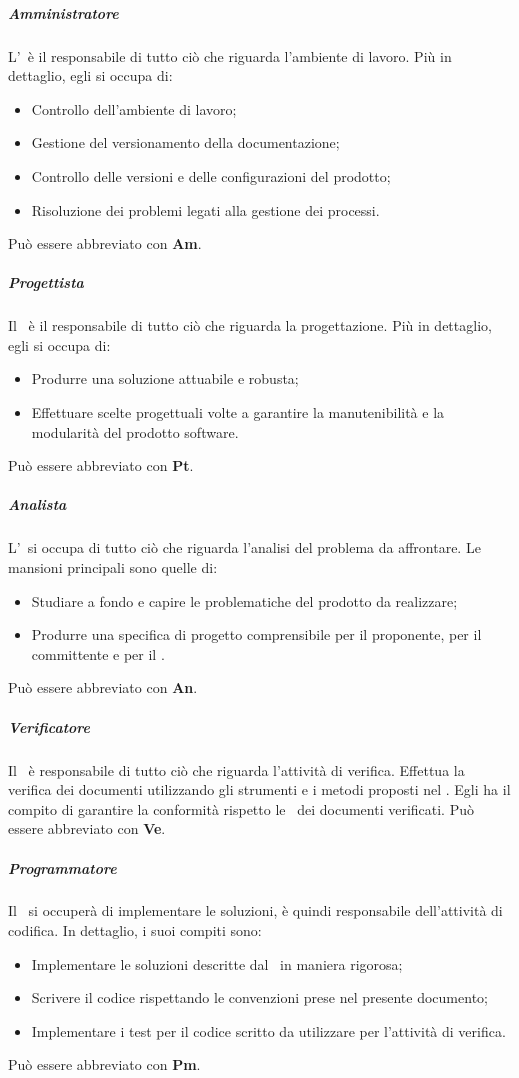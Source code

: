 \documentclass[../NormeDiProgetto_v4.0.0.tex]{subfiles}
\begin{document}
			\subparagraph{Amministratore}
			L'\amministratore\ è il responsabile di tutto ciò che riguarda l'ambiente di lavoro. Più in dettaglio, egli si occupa di:
			\begin{itemize}
			\item Controllo dell'ambiente di lavoro;
			\item Gestione del versionamento della documentazione;
			\item Controllo delle versioni e delle configurazioni del prodotto;
			\item Risoluzione dei problemi legati alla gestione dei processi.
			\end{itemize}
			Può essere abbreviato con \textbf{Am}.
			
			\subparagraph{Progettista}
			Il \progettista\ è il responsabile di tutto ciò che riguarda la progettazione.
			Più in dettaglio, egli si occupa di:
			\begin{itemize}
			\item Produrre una soluzione attuabile e robusta;
			\item Effettuare scelte progettuali volte a garantire la manutenibilità e la modularità del prodotto software.
			\end{itemize}
			Può essere abbreviato con \textbf{Pt}.
			
			\subparagraph{Analista}
			L'\analista\ si occupa di tutto ciò che riguarda l'analisi del problema da affrontare. Le mansioni principali sono quelle di:
			\begin{itemize}
			\item Studiare a fondo e capire le problematiche del prodotto da realizzare;
			\item Produrre una specifica di progetto comprensibile per il proponente, per il committente e per il \progettista.
			\end{itemize}
			Può essere abbreviato con \textbf{An}.
			
			\subparagraph{Verificatore}
			Il \verificatore\ è responsabile di tutto ciò che riguarda l'attività di verifica.
			Effettua la verifica dei documenti utilizzando gli strumenti e i metodi proposti nel
			\pianodiqualifica.
			Egli ha il compito di garantire la conformità rispetto le \normediprogetto\ dei documenti verificati.
			Può essere abbreviato con \textbf{Ve}.
			
			\subparagraph{Programmatore}
			Il \programmatore\ si occuperà di implementare le soluzioni, è quindi
			responsabile dell'attività di codifica. In dettaglio, i suoi compiti sono:
			\begin{itemize}
			\item Implementare le soluzioni descritte dal \progettista\ in maniera
			rigorosa;
			\item Scrivere il codice rispettando le convenzioni prese nel presente documento;
			\item Implementare i test per il codice scritto da utilizzare per l'attività di verifica.
			\end{itemize}
			Può essere abbreviato con \textbf{Pm}.
\end{document}
